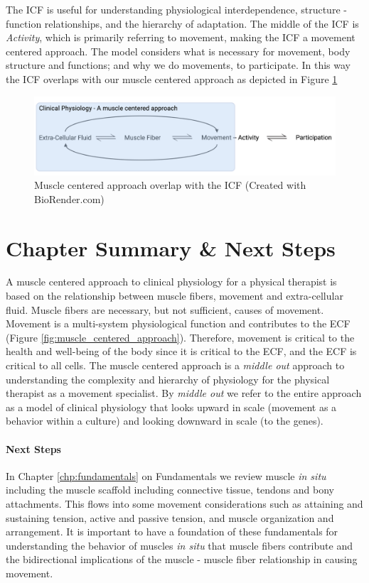 The ICF is useful for understanding physiological interdependence, structure - function relationships, and the hierarchy of adaptation. The middle of the ICF is \textit{Activity}, which is primarily referring to movement, making the ICF a movement centered approach. The model considers what is necessary for movement, body structure and functions; and why we do movements, to participate. In this way the ICF overlaps with our muscle centered approach as depicted in Figure \ref{fig:muscle_centered_approach_icf}

\begin{figure}[!ht]
    \centering
    \includegraphics[width=1\linewidth]{./figure/muscle_centered_approach_icf.png}
    \caption{Muscle centered approach overlap with the ICF \footnotesize{(Created with BioRender.com)}}
    \label{fig:muscle_centered_approach_icf}
\end{figure}

\section{Chapter Summary \& Next Steps}

A muscle centered approach to clinical physiology for a physical therapist is based on the relationship between muscle fibers, movement and extra-cellular fluid. Muscle fibers are necessary, but not sufficient, causes of movement. Movement is a multi-system physiological function and contributes to the ECF (Figure \ref{fig:muscle_centered_approach}). Therefore, movement is critical to the health and well-being of the body since it is critical to the ECF, and the ECF is critical to all cells. The muscle centered approach is a \textit{middle out}\cite{noble_music_2008} approach to understanding the complexity and hierarchy of physiology for the physical therapist as a movement specialist. By \textit{middle out} we refer to the entire approach as a model of clinical physiology that looks upward in scale (movement as a behavior within a culture) and looking downward in scale (to the genes).

\paragraph{Next Steps}
In Chapter \ref{chp:fundamentals} on Fundamentals we review muscle \textit{in situ} including the muscle scaffold including connective tissue, tendons and bony attachments. This flows into some movement considerations such as attaining and sustaining tension, active and passive tension, and muscle organization and arrangement. It is important to have a foundation of these fundamentals for understanding the behavior of muscles \textit{in situ} that muscle fibers contribute and the bidirectional implications of the muscle - muscle fiber relationship in causing movement.

\printbibliography[heading=subbibintoc]